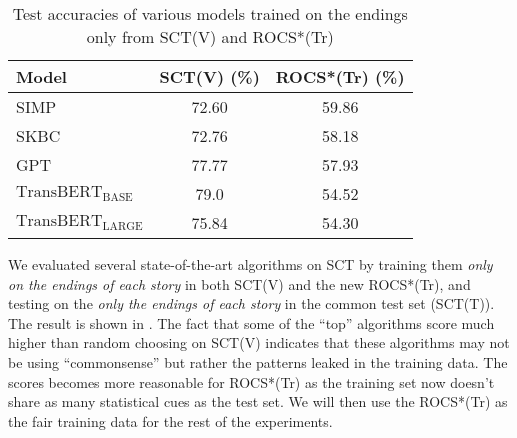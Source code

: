 \begin{table}[th]
\scriptsize
\centering
\begin{tabular}{lcc}
\hline
\textbf{Model}& SCT(V) (\%) &ROCS*(Tr) (\%)\\
\hline
SIMP& 72.60 &59.86\\
SKBC&72.76&58.18\\
GPT& 77.77 &57.93\\
$\text{TransBERT}_\text{BASE}$&79.0&54.52\\
$\text{TransBERT}_\text{LARGE}$&75.84&54.30\\
\hline
\end{tabular}
\caption{Test accuracies of various models trained on the endings only
from SCT(V) and ROCS*(Tr)}
\label{tab:end}
\end{table}

We evaluated several state-of-the-art algorithms on SCT by training them 
{\em only on the endings of each story} in both SCT(V) and the new
ROCS*(Tr), and testing on the {\em only the endings of each story} in
the common test set (SCT(T)). 
The result is shown in . 
The fact that some of the ``top'' algorithms score much
higher than random choosing on SCT(V) indicates that these algorithms may not be using 
``commonsense'' but rather the patterns leaked in the training data.
The scores becomes more reasonable for ROCS*(Tr) as the training set
now doesn't share as many statistical cues as the test set. We will then
use the ROCS*(Tr) as the fair training data for the rest of the experiments. 

